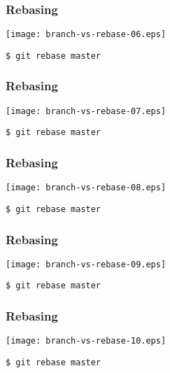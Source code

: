 \documentclass[english]{beamer}
\newcommand{\CMD}[1]{%
\texttt{\textcolor{code-blue}{#1}}%
}
\begin{document}
\begin{frame}
\frametitle{Rebasing}

\texttt{[image: branch-vs-rebase-06.eps]}
\vspace{\baselineskip}
\begin{flushright}
        \CMD{\$ git rebase master}
\end{flushright}
\vspace{\textheight}
\end{frame}

\begin{frame}
\frametitle{Rebasing}

\texttt{[image: branch-vs-rebase-07.eps]}
\vspace{\baselineskip}
\begin{flushright}
        \CMD{\$ git rebase master}
\end{flushright}
\vspace{\textheight}
\end{frame}

\begin{frame}
\frametitle{Rebasing}

\texttt{[image: branch-vs-rebase-08.eps]}
\vspace{\baselineskip}
\begin{flushright}
        \CMD{\$ git rebase master}
\end{flushright}
\vspace{\textheight}
\end{frame}

\begin{frame}
\frametitle{Rebasing}

\texttt{[image: branch-vs-rebase-09.eps]}
\vspace{\baselineskip}
\begin{flushright}
        \CMD{\$ git rebase master}
\end{flushright}
\vspace{\textheight}
\end{frame}

\begin{frame}
\frametitle{Rebasing}

\texttt{[image: branch-vs-rebase-10.eps]}
\vspace{\baselineskip}
\begin{flushright}
        \CMD{\$ git rebase master}
\end{flushright}
\vspace{\textheight}
\end{frame}
\end{document}
